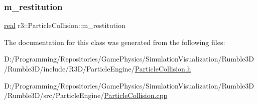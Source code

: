 \mbox{\label{classr3_1_1_particle_collision_a02dd7e5f227a429bcb707ad46adeb292}} 
\subsubsection{\texorpdfstring{m\+\_\+restitution}{m\_restitution}}
{\footnotesize\ttfamily \mbox{\hyperlink{namespacer3_ab2016b3e3f743fb735afce242f0dc1eb}{real}} r3\+::\+Particle\+Collision\+::m\+\_\+restitution\hspace{0.3cm}{\ttfamily [protected]}}



The documentation for this class was generated from the following files\+:\begin{DoxyCompactItemize}
\item 
D\+:/\+Programming/\+Repositories/\+Game\+Physics/\+Simulation\+Visualization/\+Rumble3\+D/\+Rumble3\+D/include/\+R3\+D/\+Particle\+Engine/\mbox{\hyperlink{_particle_collision_8h}{Particle\+Collision.\+h}}\item 
D\+:/\+Programming/\+Repositories/\+Game\+Physics/\+Simulation\+Visualization/\+Rumble3\+D/\+Rumble3\+D/src/\+Particle\+Engine/\mbox{\hyperlink{_particle_collision_8cpp}{Particle\+Collision.\+cpp}}\end{DoxyCompactItemize}
